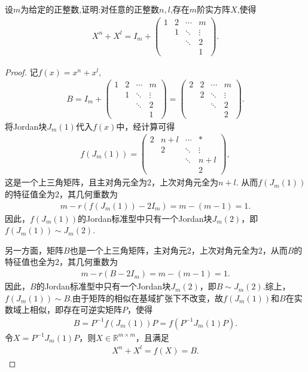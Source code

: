 \documentclass[../../main.tex]{subfiles}
\begin{document}
\begin{example}
设$m$为给定的正整数,证明:对任意的正整数$n,l$,存在$m$阶实方阵$X$,使得
\begin{align*}
X^n + X^l = I_m + \begin{pmatrix}1 & 2 & \cdots & m\\ & 1 & \ddots & \vdots\\ & & \ddots & 2\\ & & & 1\end{pmatrix}.
\end{align*}
\end{example}
\begin{proof}
记$f(x) = x^n + x^l,$
\begin{align*}
B = I_m + \begin{pmatrix}1 & 2 & \cdots & m\\ & 1 & \ddots & \vdots\\ & & \ddots & 2\\ & & & 1\end{pmatrix} = \begin{pmatrix}2 & 2 & \cdots & m\\ & 2 & \ddots & \vdots\\ & & \ddots & 2\\ & & & 2\end{pmatrix}.
\end{align*}
将Jordan块$J_m(1)$代入$f(x)$中，经计算可得
\begin{align*}
f(J_m(1)) = \begin{pmatrix}2 & n+l & \cdots & *\\ & 2 & \ddots & \vdots\\ & & \ddots & n+l\\ & & & 2\end{pmatrix},
\end{align*}
这是一个上三角矩阵，且主对角元全为$2$，上次对角元全为$n+l$.
从而$f(J_m(1))$的特征值全为$2$，其几何重数为
\begin{align*}
m - r(f(J_m(1)) - 2I_m) = m - (m - 1) = 1.
\end{align*}
因此，$f(J_m(1))$的Jordan标准型中只有一个Jordan块$J_m(2)$，即$f(J_m(1)) \sim J_m(2)$.

另一方面，矩阵$B$也是一个上三角矩阵，主对角元$2$，上次对角元全为$2$，从而$B$的特征值也全为$2$，其几何重数为
\begin{align*}
m - r(B - 2I_m) = m - (m - 1) = 1.
\end{align*}
因此，$B$的Jordan标准型中只有一个Jordan块$J_m(2)$，即$B \sim J_m(2)$.综上，$f(J_m(1)) \sim B$.由于矩阵的相似在基域扩张下不改变，故$f(J_m(1))$和$B$在实数域上相似，即存在可逆实矩阵$P$，使得
\begin{align*}
B = P^{-1}f(J_m(1))P = f(P^{-1}J_m(1)P).
\end{align*}
令$X = P^{-1}J_m(1)P$，则$X \in \mathbb{R}^{m \times m}$，且满足
\begin{align*}
X^n + X^l = f(X) = B.
\end{align*}

\end{proof}
\end{document}
